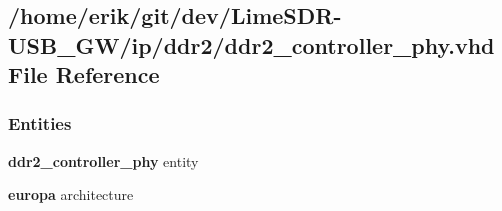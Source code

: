 \subsection{/home/erik/git/dev/\+Lime\+S\+D\+R-\/\+U\+S\+B\+\_\+\+G\+W/ip/ddr2/ddr2\+\_\+controller\+\_\+phy.vhd File Reference}
\label{ddr2__controller__phy_8vhd}
\subsubsection*{Entities}
\begin{DoxyCompactItemize}
\item 
{\bf ddr2\+\_\+controller\+\_\+phy} entity
\item 
{\bf europa} architecture
\end{DoxyCompactItemize}
